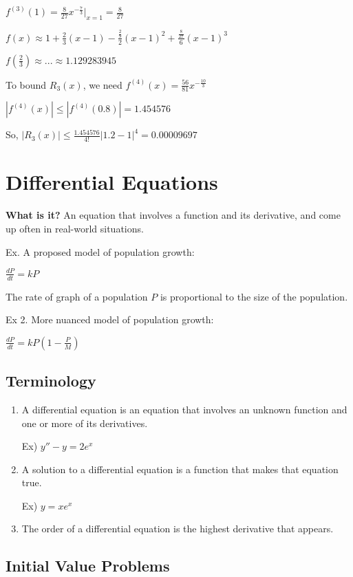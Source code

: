 \documentclass{article}
\begin{document}
$f^{(3)}(1) = \frac{8}{27}x^{-\frac{7}{3}}|_{x=1} = \frac{8}{27}$

$f(x) \approx 1+ \frac{2}{3}(x-1) -\frac{\frac{2}{9}}{2}(x-1)^2 + \frac{\frac{8}{27}}{6}(x-1)^3$

$f(\frac{2}{3}) \approx ... \approx 1.129283945$

To bound $R_3(x)$, we need $f^{(4)}(x) = \frac{56}{81}x^{-\frac{10}{3}}$

$|f^{(4)}(x)| \leq |f^{(4)}(0.8)| = 1.454576$

So, $|R_3(x)| \leq \frac{1.454576}{4!} |1.2-1|^4 = \mathbf{0.00009697}$

\section{Differential Equations}
\textbf{What is it?} An equation that involves a function and its derivative, and come up often in real-world situations.

Ex. A proposed model of population growth:

$\frac{dP}{dt} = kP$

The rate of graph of a population $P$ is proportional to the size of the population.

Ex 2. More nuanced model of population growth:

$\frac{dP}{dt} = kP(1-\frac{P}{M})$

\subsection{Terminology}

\begin{enumerate}
    \item A differential equation is an equation that involves an unknown function and one or more of its derivatives.
    
    Ex) $y'' - y = 2e^x$
    \item A solution to a differential equation is a function that makes that equation true.
    
    Ex) $y = xe^x$
    
    \item The order of a differential equation is the highest derivative that appears.
\end{enumerate}

\subsection{Initial Value Problems}
\end{document}
